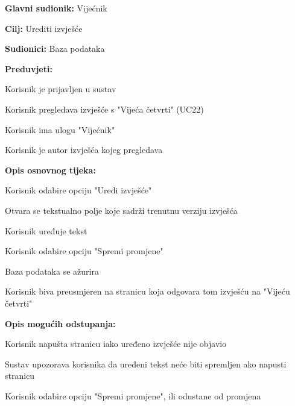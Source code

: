 					\begin{packed_item}
	
						\item \textbf{Glavni sudionik: }Vijećnik
						\item  \textbf{Cilj:} Urediti izvješće
						\item  \textbf{Sudionici:} Baza podataka
						\item  \textbf{Preduvjeti:}
						\item[] \begin{packed_enum}
							\item Korisnik je prijavljen u sustav
							\item Korisnik pregledava izvješće s "Vijeća četvrti" (UC22)
							\item Korisnik ima ulogu "Vijećnik"
							\item Korisnik je autor izvješća kojeg pregledava
						\end{packed_enum}
						\item  \textbf{Opis osnovnog tijeka:}
						
						\item[] \begin{packed_enum}
	
							\item Korisnik odabire opciju "Uredi izvješće"
							\item Otvara se tekstualno polje koje sadrži trenutnu verziju izvješća
							\item Korisnik uređuje tekst
							\item Korisnik odabire opciju "Spremi promjene"
							\item Baza podataka se ažurira
							\item Korisnik biva preusmjeren na stranicu koja odgovara tom izvješću na "Vijeću četvrti"
							
							
							
						\end{packed_enum}
						\item  \textbf{Opis mogućih odstupanja:}
						
						\item[] \begin{packed_item}
						\item[4.a] Korisnik napušta stranicu iako uređeno izvješće nije objavio
							\item[] \begin{packed_enum}
								
								\item Sustav upozorava korisnika da uređeni tekst neće biti spremljen ako napusti stranicu
								\item Korisnik odabire opciju "Spremi promjene", ili odustane od promjena
								

\end{packed_enum}
\end{packed_item}
\end{packed_item}
